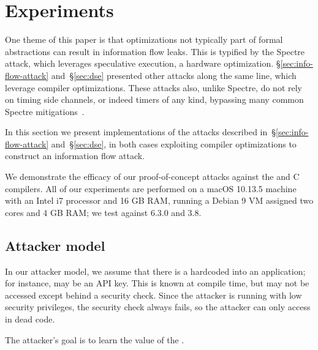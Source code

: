 \section{Experiments}
\label{sec:experiments}

One theme of this paper is that optimizations not typically part of formal
abstractions can result in information flow leaks.
This is typified by the Spectre attack, which leverages speculative execution,
a hardware optimization.
\S\ref{sec:info-flow-attack} and~\S\ref{sec:dse} presented other attacks
along the same line, which leverage compiler optimizations.
These attacks also, unlike Spectre, do not rely on timing side channels, or
indeed timers of any kind, bypassing many common Spectre mitigations~\cite{???}.

In this section we present implementations of the attacks described
in~\S\ref{sec:info-flow-attack} and~\S\ref{sec:dse}, in both cases
exploiting compiler optimizations to construct an information flow attack.
We demonstrate the efficacy of our proof-of-concept attacks against
the {\CLANG} and {\GCC} C compilers.
All of our experiments are performed on a macOS 10.13.5 machine with an Intel
i7 processor and 16 GB RAM, running a Debian 9 VM assigned two cores
and 4 GB RAM; we test against {\GCC} 6.3.0 and {\CLANG} 3.8.

\subsection{Attacker model}
\label{subsec:attacker-model}

In our attacker model, we assume that there is a {\SEC} hardcoded into an
application; for instance, {\SEC} may be an API key.
This {\SEC} is known at compile time, but may not be
accessed except behind a security check.
Since the attacker is running with low security privileges,
the security check always fails,
so the attacker can only access {\SEC} in dead code.
The attacker's goal is to learn the value of the {\SEC}.

